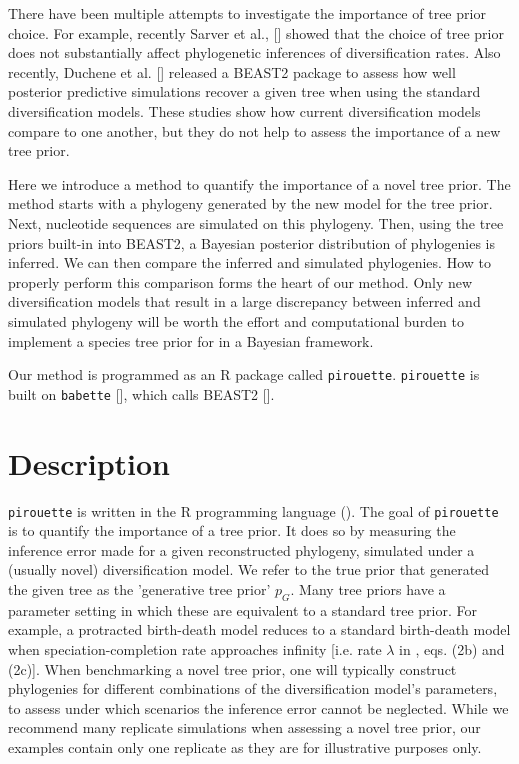 There have been multiple attempts to investigate the importance of tree
prior choice. For example, recently Sarver et al., [\cite{sarver2019choice}] 
showed that the choice of tree prior does not 
substantially affect phylogenetic inferences of diversification rates.
Also recently, Duchene et al. [\cite{duchene2018phylodynamic}] released
a BEAST2 package to assess how well posterior predictive simulations
recover a given tree when using the standard diversification models.
These studies show how current diversification models compare
to one another, but they do not help to assess the importance of a new tree prior. 

Here we introduce a method to quantify the importance of a novel tree prior.
The method starts with a phylogeny generated by the new model for the tree prior. Next, nucleotide sequences are simulated on this phylogeny. Then, using the tree priors built-in into BEAST2, a Bayesian posterior distribution of phylogenies is inferred. We can then compare the inferred and simulated phylogenies. How to properly perform this comparison forms the heart of our method.
Only new diversification models that result in a large discrepancy between inferred and simulated phylogeny will be worth the effort and computational burden 
to implement a species tree prior for in a Bayesian framework.

Our method is programmed as an R package called \verb;pirouette;.
\verb;pirouette; is built on \verb;babette; [\cite{bilderbeek2018babette}], 
which calls BEAST2 [\cite{bouckaert2014beast}]. 

\section{Description}

\verb;pirouette; is written in the R programming language (\cite{R}).
The goal of \verb;pirouette; is to quantify the importance of a tree prior.
It does so by measuring the inference error made for a given reconstructed phylogeny, 
simulated under a (usually novel) diversification model.
We refer to the true prior that generated the given tree
as the 'generative tree prior' $\mathit{p_{G}}$.
Many tree priors have a parameter setting in which these are equivalent
to a standard tree prior. For example, a protracted birth-death model reduces to a standard birth-death model when speciation-completion rate approaches infinity [i.e. rate $\lambda$ in \cite{etienne2014estimating}, eqs. (2b) and (2c)].
When benchmarking a novel tree prior, 
one will typically construct phylogenies 
for different combinations of the diversification model's parameters, 
to assess under which scenarios the inference error cannot be neglected. 
While we recommend many replicate simulations when assessing a novel tree prior, our examples contain only one replicate as they are for illustrative purposes only.

